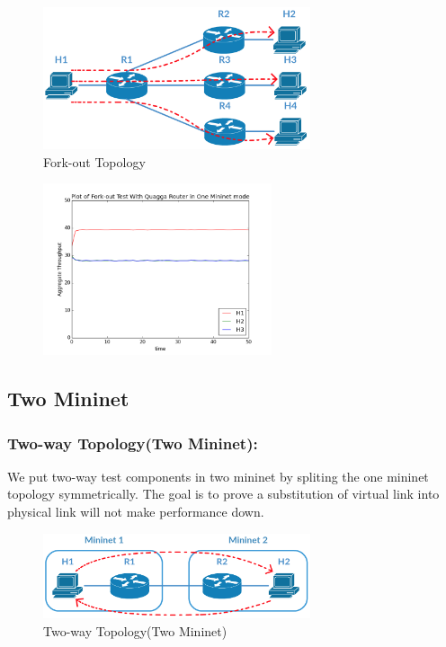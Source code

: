 \begin{figure}[h]
\centering
\includegraphics[width=0.7\textwidth]{./Figure/OneMininet(SDN+NONSDN)/ForkOut/ForkOut(OneMininet).png}
\caption{Fork-out Topology \label{fig:Fork-out Topology}}
\end{figure}

\begin{figure}[h]
\centering
\includegraphics[width=0.6\textwidth]{./Figure/OneMininet(SDN+NONSDN)/ForkOut/ForkOut.png}
\end{figure}

\subsection{Two Mininet}\label{two-mininet}

\subsubsection{Two-way Topology(Two Mininet):}\label{two-way-topologytwo-mininet}

We put two-way test components in two mininet by spliting the one
mininet topology symmetrically. The goal is to prove a substitution of
virtual link into physical link will not make performance down.

\begin{figure}[h]
\centering
\includegraphics[width=0.7\textwidth]{./Figure/Hybrid/TwoWay/Twoway(TwoMininet).png}
\caption{Two-way Topology(Two Mininet) \label{fig:Two-way Topology(Two Mininet)}}
\end{figure}

